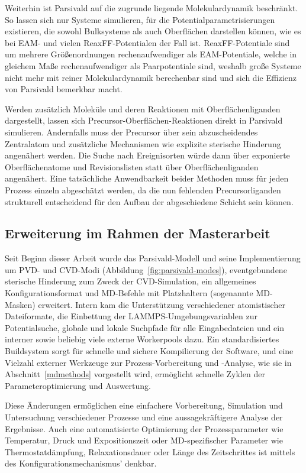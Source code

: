 Weiterhin ist Parsivald auf die zugrunde liegende Molekulardynamik beschränkt.
So lassen sich nur Systeme simulieren, für die Potentialparametrisierungen existieren, die sowohl Bulksysteme als auch Oberflächen darstellen können, wie es bei EAM- und vielen ReaxFF-Potentialen der Fall ist.
ReaxFF-Potentiale sind um mehrere Größenordnungen rechenaufwendiger als EAM-Potentiale, welche in gleichem Maße rechenaufwendiger als Paarpotentiale sind, weshalb große Systeme nicht mehr mit reiner Molekulardynamik berechenbar sind und sich die Effizienz von Parsivald bemerkbar macht.

Werden zusätzlich Moleküle und deren Reaktionen mit Oberflächenliganden dargestellt, lassen sich Precursor-Oberflächen-Reaktionen direkt in Parsivald simulieren.
Andernfalls muss der Precursor über sein abzuscheidendes Zentralatom und zusätzliche Mechanismen wie explizite sterische Hinderung angenähert werden.
Die Suche nach Ereignisorten würde dann über exponierte Oberflächenatome und Revisionslisten statt über Oberflächenliganden angenähert.
Eine tatsächliche Anwendbarkeit beider Methoden muss für jeden Prozess einzeln abgeschätzt werden, da die nun fehlenden Precursorliganden strukturell entscheidend für den Aufbau der abgeschiedene Schicht sein können.

\subsection{Erweiterung im Rahmen der Masterarbeit}

Seit Beginn dieser Arbeit wurde das Parsivald-Modell und seine Implementierung um PVD- und CVD-Modi (Abbildung~\ref{fig:parsivald-modes}), eventgebundene sterische Hinderung zum Zweck der CVD-Simu\-lation, ein allgemeines Konfigurationsformat und MD-Befehle mit Platzhaltern (sogenannte MD-Masken) erweitert.
Intern kam die Unterstützung verschiedener atomistischer Dateiformate, die Einbettung der LAMMPS-Umgebungs\-variablen zur Potentialsuche, globale und lokale Suchpfade für alle Eingabedateien und ein interner sowie beliebig viele externe Workerpools dazu.
Ein standardisiertes Buildsystem sorgt für schnelle und sichere Kompilierung der Software, und eine Vielzahl externer Werkzeuge zur Prozess-Vorbereitung und -Analyse, wie sie in Abschnitt~\ref{mdmethods} vorgestellt wird, ermöglicht schnelle Zyklen der Parameteroptimierung und Auswertung.

Diese Änderungen ermöglichen eine einfachere Vorbereitung, Simulation und Untersuchung verschiedener Prozesse und eine aussagekräftigere Analyse der Ergebnisse.
Auch eine automatisierte Optimierung der Prozessparameter wie Temperatur, Druck und Expositionszeit oder MD-spezifischer Parameter wie Thermostatdämpfung, Relaxationsdauer oder Länge des Zeitschrittes ist mittels des Konfigurationsmechanismus' denkbar.

